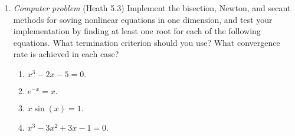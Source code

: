 \documentclass{article}
\begin{document}
\begin{enumerate}
\item \emph{Computer problem} (Heath 5.3) Implement the bisection, Newton, and secant methods for soving nonlinear equations in one dimension, and test your implementation by finding at least one
  root for each of the following equations.  What termination criterion should you use?  What convergence rate is achieved in each case?
\begin{enumerate}
\item $x^3 - 2 x - 5 = 0.$
\item $e^{-x} = x.$
\item $x \sin(x) = 1.$
\item $x^3 - 3 x^2 + 3 x - 1 = 0.$
\end{enumerate}

\end{enumerate}
\end{document}
